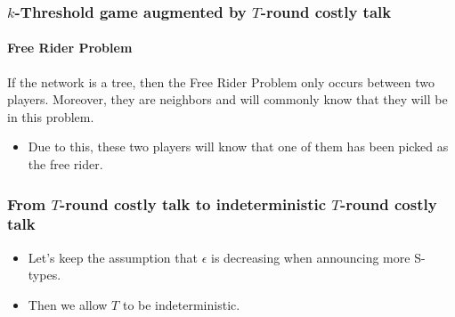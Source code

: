 \documentclass[9pt,handout]{beamer}
\begin{document}
\begin{frame}
\frametitle{$k$-Threshold game augmented by $T$-round costly talk}
  \framesubtitle{Free Rider Problem}
  
\begin{lemma} If the network is a tree, then the Free Rider Problem only occurs between two players. Moreover, they are neighbors and will commonly know that they will be in this problem.
\end{lemma}  
\begin{itemize}
\item Due to this, these two players will know that one of them has been picked as the free rider. 
\end{itemize}
\end{frame}


\begin{frame}
\frametitle{From $T$-round costly talk to indeterministic $T$-round costly talk}
\begin{itemize}
\item Let's keep the assumption that $\epsilon$ \alert{is decreasing} when announcing \alert{more} S-types.
\item Then we allow $T$ to be indeterministic.
\end{itemize}
\end{frame}
\end{document}
